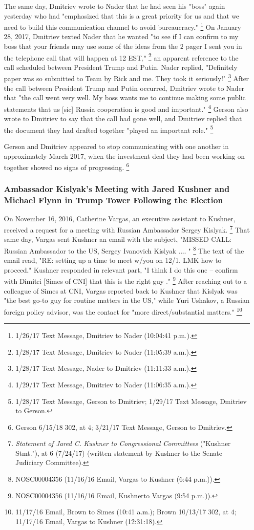 The same day, Dmitriev wrote to Nader that he had seen his "boss" again yesterday who had "emphasized that this is a great priority for us and that we need to build this communication channel to avoid bureaucracy."%
\footnote{1/26/17 Text Message, Dmitriev to Nader (10:04:41 p.m.).}
On January 28, 2017, Dmitriev texted Nader that he wanted "to see if I can confirm to my boss that your friends may use some of the ideas from the 2 pager I sent you in the telephone call that will happen at 12 EST,"%
\footnote{1/28/17 Text Message, Dmitriev to Nader (11:05:39 a.m.).}
an apparent reference to the call scheduled between President Trump and Putin.
Nader replied, "Definitely paper was so submitted to Team by Rick and me.
They took it seriously!"%
\footnote{1/28/17 Text Message, Nader to Dmitriev (11:11:33 a.m.).}
After the call between President Trump and Putin occurred, Dmitriev wrote to Nader that "the call went very well.
My boss wants me to continue making some public statements that us [sic] Russia cooperation is good and important."%
\footnote{1/29/17 Text Message, Dmitriev to Nader (11:06:35 a.m.).}
Gerson also wrote to Dmitriev to say that the call had gone well, and Dmitriev replied that the document they had drafted together "played an important role."%
\footnote{1/28/17 Text Message, Gerson to Dmitriev;
1/29/17 Text Message, Dmitriev to Gerson.}

Gerson and Dmitriev appeared to stop communicating with one another in approximately March 2017, when the investment deal they had been working on together showed no signs of progressing.%
\footnote{Gerson 6/15/18 302, at 4;
3/21/17 Text Message, Gerson to Dmitriev.}

\subsubsection{Ambassador Kislyak's Meeting with Jared Kushner and Michael Flynn in Trump Tower Following the Election}

On November 16, 2016, Catherine Vargas, an executive assistant to Kushner, received a request for a meeting with Russian Ambassador Sergey Kislyak.%
\footnote{\textit{Statement of Jared C. Kushner to Congressional Committees} ("Kushner Stmt."), at 6 (7/24/17) (written statement by Kushner to the Senate Judiciary Committee).}
That same day, Vargas sent Kushner an email with the subject, "MISSED CALL: Russian Ambassador to the US, Sergey Ivanovich Kislyak .... "%
\footnote{NOSC00004356 (11/16/16 Email, Vargas to Kushner (6:44 p.m.)).}
The text of the email read, "RE: setting up a time to meet w/you on 12/1. LMK how to proceed."
Kushner responded in relevant part, "I think I do this one -- confirm with Dimitri [Simes of CNI] that this is the right guy ."%
\footnote{NOSC00004356 (11/16/16 Email, Kushnerto Vargas (9:54 p.m.)).}
After reaching out to a colleague of Simes at CNI, Vargas reported back to Kushner that Kislyak was "the best go-to guy for routine matters in the US," while Yuri Ushakov, a Russian foreign policy advisor, was the contact for "more direct/substantial matters."%
\footnote{11/17/16 Email, Brown to Simes (10:41 a.m.);
Brown 10/13/17 302, at 4;
11/17/16 Email, Vargas to Kushner (12:31:18).}

